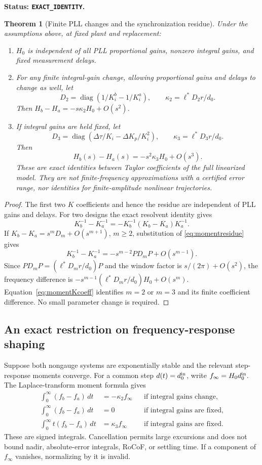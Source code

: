 \documentclass[11pt]{article}
\newtheorem{theorem}{Theorem}
\newcommand{\diag}{\operatorname{diag}}
\newcommand{\status}[1]{\par\smallskip\noindent\textbf{Status: \texttt{#1}.}\ }
\begin{document}
\status{EXACT\_IDENTITY}
\begin{theorem}[Finite PLL changes and the synchronization residue]
\label{thm:momentlaw}
Under the assumptions above, at fixed plant and replacement:
\begin{enumerate}
\item $H_0$ is independent of all PLL proportional gains, nonzero integral
gains, and fixed measurement delays.
\item For any finite integral-gain change, allowing proportional gains and
delays to change as well, let
\[
 D_2=\diag(1/K_i^{b}-1/K_i^{a}),\qquad
 \kappa_2=\ell^*D_2r/d_0.
\]
Then $H_b-H_a=-s\kappa_2H_0+O(s^2)$.
\item If integral gains are held fixed, let
\[
 D_3=\diag(\Delta\tau/K_i-\Delta K_p/K_i^2),\qquad
 \kappa_3=\ell^*D_3r/d_0.
\]
Then
\begin{equation}
 \boxed{H_b(s)-H_a(s)=-s^2\kappa_3H_0+O(s^3).}
 \label{eq:momentlaw}
\end{equation}
These are exact identities between Taylor coefficients of the full linearized
model. They are not finite-frequency approximations with a certified error
range, nor identities for finite-amplitude nonlinear trajectories.
\end{enumerate}
\end{theorem}
\begin{proof}
The first two $K$ coefficients and hence the residue are independent of PLL
gains and delays. For two designs the exact resolvent identity gives
\[
 K_b^{-1}-K_a^{-1}=-K_b^{-1}(K_b-K_a)K_a^{-1}.
\]
If $K_b-K_a=s^mD_m+O(s^{m+1})$, $m\ge2$, substitution of
\eqref{eq:momentresidue} gives
\[
 K_b^{-1}-K_a^{-1}=-s^{m-2}PD_mP+O(s^{m-1}).
\]
Since $PD_mP=(\ell^*D_mr/d_0)P$ and the window factor is
$s/(2\pi)+O(s^2)$, the frequency difference is
$-s^{m-1}(\ell^*D_mr/d_0)H_0+O(s^m)$.
Equation~\eqref{eq:momentKcoeff} identifies $m=2$ or $m=3$ and its finite
coefficient difference. No small parameter change is required.
\end{proof}

\subsection{An exact restriction on frequency-response shaping}
Suppose both nongauge systems are exponentially stable and the relevant
step-response moments converge. For a common step $d(t)=d_0^{\rm in}$,
write $f_\infty=H_0d_0^{\rm in}$. The Laplace-transform moment formula gives
\begin{align}
 \int_0^\infty(f_b-f_a)\,dt&=-\kappa_2f_\infty
       &&\text{if integral gains change},\label{eq:arealaw}\\
 \int_0^\infty(f_b-f_a)\,dt&=0
       &&\text{if integral gains are fixed},\\
 \int_0^\infty t(f_b-f_a)\,dt&=\kappa_3f_\infty
       &&\text{if integral gains are fixed}.\label{eq:firstmomentlaw}
\end{align}
These are signed integrals. Cancellation permits large excursions and does
not bound nadir, absolute-error integrals, RoCoF, or settling time.
If a component of $f_\infty$ vanishes, normalizing by it is invalid.
\end{document}
